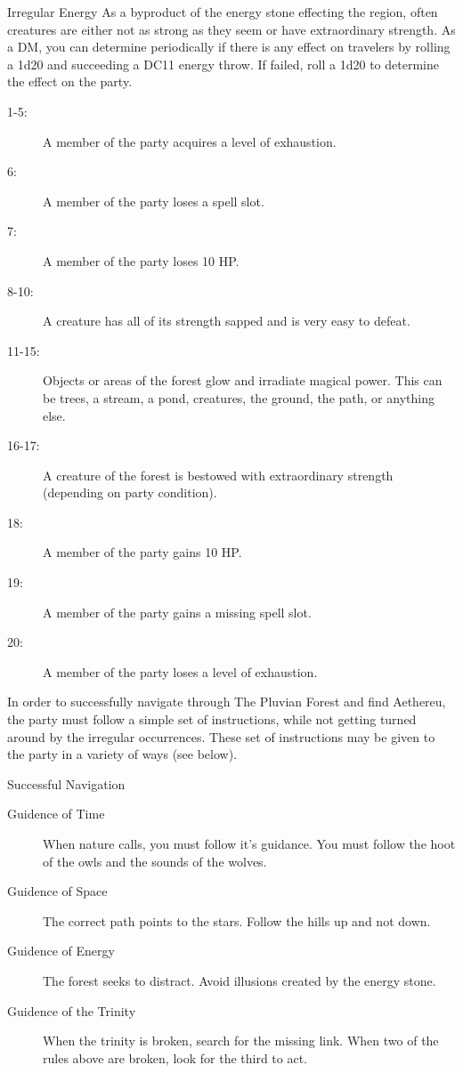 \begin{commentbox}{Irregular Energy}
	As a byproduct of the energy stone effecting the region, often creatures are either not as strong as they seem or have extraordinary strength. As a DM, you can determine periodically if there is any effect on travelers by rolling a 1d20 and succeeding a DC11 energy throw. If failed, roll a 1d20 to determine the effect on the party.
	\hline
	\begin{description}
		\item[1-5:] A member of the party acquires a level of exhaustion.
		\item[6:] A member of the party loses a spell slot.
		\item[7:] A member of the party loses 10 HP.
		\item[8-10:] A creature has all of its strength sapped and is very easy to defeat.
		\item[11-15:] Objects or areas of the forest glow and irradiate magical power. This can be trees, a stream, a pond, creatures, the ground, the path, or anything else. 
		\item[16-17:] A creature of the forest is bestowed with extraordinary strength (depending on party condition).
		\item[18:] A member of the party gains 10 HP. 
		\item[19:] A member of the party gains a missing spell slot. 
		\item[20:] A member of the party loses a level of exhaustion.
	\end{description}
\end{commentbox}

In order to successfully navigate through The Pluvian Forest and find Aethereu, the party must follow a simple set of instructions, while not getting turned around by the irregular occurrences. These set of instructions may be given to the party in a variety of ways (see below). 

\begin{commentbox}{Successful Navigation}
	\begin{description}
		\item[Guidence of Time] When nature calls, you must follow it's guidance. You must follow the hoot of the owls and the sounds of the wolves.
		\item[Guidence of Space] The correct path points to the stars. Follow the hills up and not down.
		\item[Guidence of Energy] The forest seeks to distract. Avoid illusions created by the energy stone.
		\item[Guidence of the Trinity] When the trinity is broken, search for the missing link. When two of the rules above are broken, look for the third to act.
	\end{description}
\end{commentbox}

